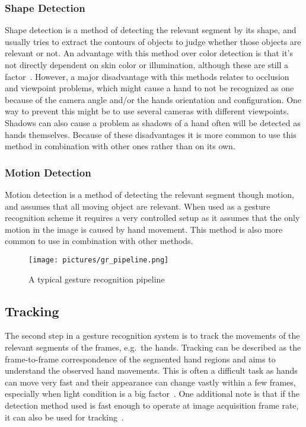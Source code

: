 \subsubsection{Shape Detection} 
Shape detection is a method of detecting the relevant segment by its shape, and usually tries to extract the contours of objects to judge
whether those objects are relevant or not. An advantage with this method over color detection is that it's not directly dependent on skin color or
illumination, although these are still a factor~\citep{Rautaray2015}. However, a major disadvantage with this methods relates to occlusion and viewpoint
problems, which might cause a hand to not be recognized as one because of the camera angle and/or the hands orientation and configuration. One way to prevent this
might be to use several cameras with different viewpoints.
Shadows can also cause a problem as shadows of a hand often will be detected as hands themselves. Because of these disadvantages it is more
common to use this method in combination with other ones rather than on its own.

\subsubsection{Motion Detection} 
Motion detection is a method of detecting the relevant segment though motion, and assumes that all moving object are relevant.
When used as a gesture recognition scheme it requires a very controlled setup as it assumes that the only motion in the image is caused by hand movement. 
This method is also more common to use in combination with other methods.

\begin{figure}%
	\texttt{[image: pictures/gr\_pipeline.png]}
	\caption[The gesture recognition pipeline]{A typical gesture recognition pipeline~\citep{Pisharady2015} }
	\label{fig:gr_pipeline}
\end{figure}

\subsection{Tracking}
The second step in a gesture recognition system is to track the movements of the relevant segments of the frames, e.g.~the hands. 
Tracking can be described as the frame-to-frame correspondence of the segmented hand regions and aims to understand the observed hand movements. 
This is often a difficult task as hands can move very fast and their appearance can change vastly within a few frames, 
especially when light condition is a big factor~\citep{Wang2010}. 
One additional note is that if the detection method used is fast enough to operate at image acquisition frame rate, it can also be used for tracking~\citep{Rautaray2015}.   


